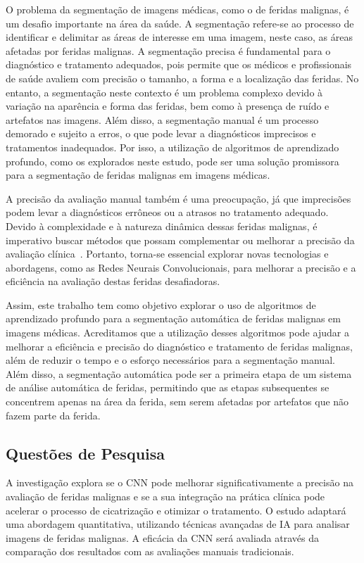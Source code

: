 O problema da segmentação de imagens médicas, como o de feridas malignas, é um desafio importante na área da saúde. A segmentação refere-se ao processo de identificar e delimitar as áreas de interesse em uma imagem, neste caso, as áreas afetadas por feridas malignas. A segmentação precisa é fundamental para o diagnóstico e tratamento adequados, pois permite que os médicos e profissionais de saúde avaliem com precisão o tamanho, a forma e a localização das feridas. No entanto, a segmentação neste contexto é um problema complexo devido à variação na aparência e forma das feridas, bem como à presença de ruído e artefatos nas imagens. Além disso, a segmentação manual é um processo demorado e sujeito a erros, o que pode levar a diagnósticos imprecisos e tratamentos inadequados. Por isso, a utilização de algoritmos de aprendizado profundo, como os explorados neste estudo, pode ser uma solução promissora para a segmentação de feridas malignas em imagens médicas.

A precisão da avaliação manual também é uma preocupação, já que imprecisões podem levar a diagnósticos errôneos ou a atrasos no tratamento adequado. Devido à complexidade e à natureza dinâmica dessas feridas malignas, é imperativo buscar métodos que possam complementar ou melhorar a precisão da avaliação clínica~\cite{de2023estimativa}. Portanto, torna-se essencial explorar novas tecnologias e abordagens, como as Redes Neurais Convolucionais, para melhorar a precisão e a eficiência na avaliação destas feridas desafiadoras.

Assim, este trabalho tem como objetivo explorar o uso de algoritmos de aprendizado profundo para a segmentação automática de feridas malignas em imagens médicas. Acreditamos que a utilização desses algoritmos pode ajudar a melhorar a eficiência e precisão do diagnóstico e tratamento de feridas malignas, além de reduzir o tempo e o esforço necessários para a segmentação manual. Além disso, a segmentação automática pode ser a primeira etapa de um sistema de análise automática de feridas, permitindo que as etapas subsequentes se concentrem apenas na área da ferida, sem serem afetadas por artefatos que não fazem parte da ferida.

\subsection{Questões de Pesquisa}
 A investigação explora se o \ac{CNN} pode melhorar significativamente a precisão na avaliação de feridas malignas e se a sua integração na prática clínica pode acelerar o processo de cicatrização e otimizar o tratamento. %
 O estudo adaptará uma abordagem quantitativa, utilizando técnicas avançadas de \ac{IA} para analisar imagens de feridas malignas. A eficácia da \ac{CNN} será avaliada através da comparação dos resultados com as avaliações manuais tradicionais.
